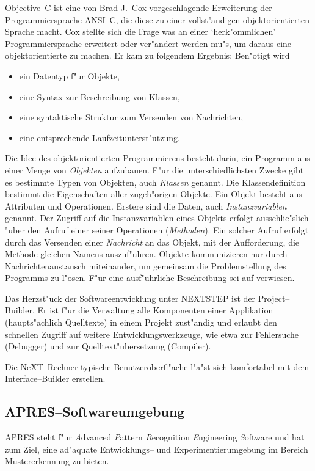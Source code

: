 Objective--C ist eine von Brad J.\ Cox vorgeschlagende Erweiterung der Programmiersprache ANSI--C,
die diese zu einer vollst"andigen objektorientierten Sprache macht. Cox stellte sich die Frage was
an einer `herk"ommlichen' Programmiersprache erweitert oder ver"andert werden mu"s, um daraus eine 
objektorientierte zu machen. Er kam zu folgendem Ergebnis: Ben"otigt wird
\begin{itemize}
  \item ein Datentyp f"ur Objekte,
  \item eine Syntax zur Beschreibung von Klassen,
  \item eine syntaktische Struktur zum Versenden von Nachrichten,
  \item eine entsprechende Laufzeitunterst"utzung.
\end{itemize}
Die Idee des objektorientierten Programmierens besteht darin, ein Programm aus einer Menge von 
{\em Objekten\/} aufzubauen. F"ur die unterschiedlichsten Zwecke gibt es bestimmte Typen 
von Objekten, auch {\em Klassen\/} genannt. 
Die Klassendefinition bestimmt die Eigenschaften aller zugeh"origen Objekte.
Ein Objekt besteht aus Attributen und Operationen. Erstere sind die Daten, auch 
{\em Instanzvariablen\/} genannt. Der Zugriff auf die Instanzvariablen eines Objekts erfolgt 
ausschlie"slich "uber den Aufruf einer seiner Operationen ({\em Methoden\/}).
Ein solcher Aufruf erfolgt durch das Versenden einer {\em Nachricht\/} an das Objekt, mit der
Aufforderung, die Methode gleichen Namens auszuf"uhren. Objekte kommunizieren nur
durch Nachrichtenaustausch miteinander, um gemeinsam die Problemstellung des Programms zu l"osen.
F"ur eine ausf"uhrliche Beschreibung sei auf \cite{ct94} verwiesen. 

Das Herzst"uck der Softwareentwicklung unter NEXTSTEP ist der Project--Builder. Er ist f"ur die
Verwaltung alle Komponenten einer Applikation (haupts"achlich Quelltexte) in einem Projekt zust"andig
und erlaubt den schnellen Zugriff auf weitere Entwicklungswerkzeuge, wie etwa zur Fehlersuche 
(Debugger) und zur Quelltext"ubersetzung (Compiler).

Die NeXT--Rechner typische Benutzeroberfl"ache l"a"st sich komfortabel mit dem Interface--Builder erstellen.

\subsection*{APRES--Softwareumgebung}

APRES steht f"ur {\sl A\/}dvanced {\sl P\/}attern {\sl R\/}ecognition {\sl E\/}ngineering
{\sl S\/}oftware und hat zum Ziel, eine ad"aquate Entwicklungs-- und Experimentierumgebung
im Bereich Mustererkennung zu bieten.

